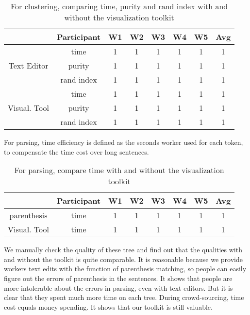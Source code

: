 \begin{table*}[bt]
\begin{center}
\begin{tabular}{|c|c|c|c|c|c|c|c|}
 \hline
 & Participant & W1 & W2 & W3 & W4 & W5 & Avg \\\hline
 & time & 1& 1 & 1 & 1 & 1 & 1\\
Text Editor& purity & 1 & 1 & 1& 1 & 1 & 1\\
& rand index & 1 & 1 & 1& 1 & 1 & 1\\\hline
& time & 1& 1 & 1 & 1 & 1 & 1\\
Visual. Tool& purity & 1 & 1 & 1& 1 & 1 & 1\\
& rand index & 1 & 1 & 1& 1 & 1 & 1\\
\hline
\end{tabular}
\end{center}
\caption{For clustering, comparing time, purity and rand index with and without the visualization toolkit} \label{t:cluster}
\end{table*}

For parsing, time efficiency is defined as the seconds worker used for each token, to compensate the time cost over long sentences. 
\begin{table*}[bt]
\begin{center}
\begin{tabular}{|c|c|c|c|c|c|c|c|}
 \hline
 & Participant & W1 & W2 & W3 & W4 & W5 & Avg \\\hline
parenthesis & time & 1& 1 & 1 & 1 & 1 & 1\\\hline
Visual. Tool& time & 1 & 1 & 1& 1 & 1 & 1\\\hline
\end{tabular}
\end{center}
\caption{For parsing, compare time with and without the visualization toolkit} \label{t:cluster}
\end{table*}
We manually check the quality of these tree and find out that the qualities with and without the toolkit is quite comparable. It is reasonable because we provide workers text edits with the function of parenthesis matching, so people can easily figure out the errors of parenthesis in the sentences. It shows that people are more intolerable about the errors in parsing, even with text editors. But it is clear that they spent much more time on each tree. During crowd-sourcing, time cost equals money spending. It shows that our toolkit is still valuable. 




